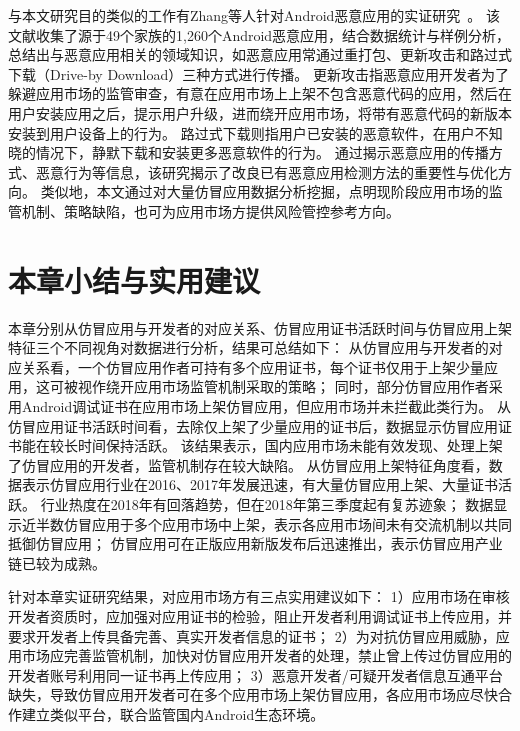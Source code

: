 与本文研究目的类似的工作有Zhang等人针对Android恶意应用的实证研究~\cite{Zhou2012DissectingAM}。
该文献收集了源于49个家族的1,260个Android恶意应用，结合数据统计与样例分析，总结出与恶意应用相关的领域知识，如恶意应用常通过重打包、更新攻击和路过式下载（Drive-by Download）三种方式进行传播。
更新攻击指恶意应用开发者为了躲避应用市场的监管审查，有意在应用市场上上架不包含恶意代码的应用，然后在用户安装应用之后，提示用户升级，进而绕开应用市场，将带有恶意代码的新版本安装到用户设备上的行为。
路过式下载则指用户已安装的恶意软件，在用户不知晓的情况下，静默下载和安装更多恶意软件的行为。
通过揭示恶意应用的传播方式、恶意行为等信息，该研究揭示了改良已有恶意应用检测方法的重要性与优化方向。
类似地，本文通过对大量仿冒应用数据分析挖掘，点明现阶段应用市场的监管机制、策略缺陷，也可为应用市场方提供风险管控参考方向。


\section{本章小结与实用建议}
本章分别从仿冒应用与开发者的对应关系、仿冒应用证书活跃时间与仿冒应用上架特征三个不同视角对数据进行分析，结果可总结如下：
从仿冒应用与开发者的对应关系看，一个仿冒应用作者可持有多个应用证书，每个证书仅用于上架少量应用，这可被视作绕开应用市场监管机制采取的策略；
同时，部分仿冒应用作者采用Android调试证书在应用市场上架仿冒应用，但应用市场并未拦截此类行为。
从仿冒应用证书活跃时间看，去除仅上架了少量应用的证书后，数据显示仿冒应用证书能在较长时间保持活跃。
该结果表示，国内应用市场未能有效发现、处理上架了仿冒应用的开发者，监管机制存在较大缺陷。
从仿冒应用上架特征角度看，数据表示仿冒应用行业在2016、2017年发展迅速，有大量仿冒应用上架、大量证书活跃。
行业热度在2018年有回落趋势，但在2018年第三季度起有复苏迹象；
数据显示近半数仿冒应用于多个应用市场中上架，表示各应用市场间未有交流机制以共同抵御仿冒应用；
仿冒应用可在正版应用新版发布后迅速推出，表示仿冒应用产业链已较为成熟。

针对本章实证研究结果，对应用市场方有三点实用建议如下：
1）应用市场在审核开发者资质时，应加强对应用证书的检验，阻止开发者利用调试证书上传应用，并要求开发者上传具备完善、真实开发者信息的证书；
2）为对抗仿冒应用威胁，应用市场应完善监管机制，加快对仿冒应用开发者的处理，禁止曾上传过仿冒应用的开发者账号利用同一证书再上传应用；
3）恶意开发者/可疑开发者信息互通平台缺失，导致仿冒应用开发者可在多个应用市场上架仿冒应用，各应用市场应尽快合作建立类似平台，联合监管国内Android生态环境。
